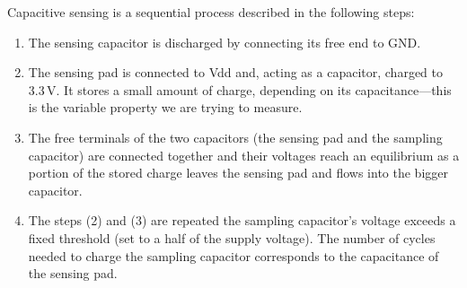 Capacitive sensing is a sequential process described in the following steps:

\begin{enumerate}
	\item The sensing capacitor is discharged by connecting its free end to GND.
	\item The sensing pad is connected to Vdd and, acting as a capacitor, charged to 3.3\,V. It stores a small amount of charge, depending on its capacitance---this is the variable property we are trying to measure.
	\item The free terminals of the two capacitors (the sensing pad and the sampling capacitor) are connected together and their voltages reach an equilibrium as a portion of the stored charge leaves the sensing pad and flows into the bigger capacitor.
	\item The steps (2) and (3) are repeated the sampling capacitor's voltage exceeds a fixed threshold (set to a half of the supply voltage). The number of cycles needed to charge the sampling capacitor corresponds to the capacitance of the sensing pad.
\end{enumerate}

